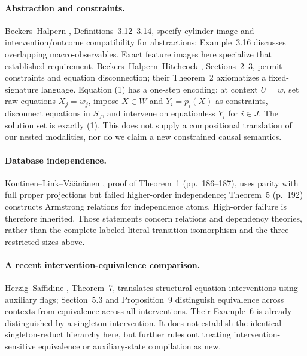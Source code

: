 \documentclass[11pt]{article}
\begin{document}
\paragraph{Abstraction and constraints.}
Beckers--Halpern \cite{bh}, Definitions~3.12--3.14, specify cylinder-image and intervention/outcome compatibility for abstractions; Example~3.16 discusses overlapping macro-observables. Exact feature images here specialize that established requirement. Beckers--Halpern--Hitchcock \cite{constraints}, Sections~2--3, permit constraints and equation disconnection; their Theorem~2 axiomatizes a fixed-signature language. Equation (1) has a one-step encoding: at context $U=w$, set raw equations $X_j=w_j$, impose $X\in W$ and $Y_i=p_i(X)$ as constraints, disconnect equations in $S_J$, and intervene on equationless $Y_i$ for $i\in J$. The solution set is exactly (1). This does not supply a compositional translation of our nested modalities, nor do we claim a new constrained causal semantics.

\paragraph{Database independence.}
Kontinen--Link--V\"a\"an\"anen \cite{klv}, proof of Theorem~1 (pp.~186--187), uses parity with full proper projections but failed higher-order independence; Theorem~5 (p.~192) constructs Armstrong relations for independence atoms. High-order failure is therefore inherited. Those statements concern relations and dependency theories, rather than the complete labeled literal-transition isomorphism and the three restricted sizes above.

\paragraph{A recent intervention-equivalence comparison.}
Herzig--Saffidine \cite{hs}, Theorem~7, translates structural-equation interventions using auxiliary flags; Section~5.3 and Proposition~9 distinguish equivalence across contexts from equivalence across all interventions. Their Example~6 is already distinguished by a singleton intervention. It does not establish the identical-singleton-reduct hierarchy here, but further rules out treating intervention-sensitive equivalence or auxiliary-state compilation as new.
\end{document}
